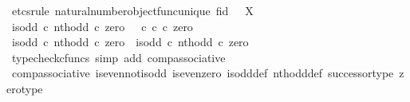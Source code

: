 \begin{isabellebody}
%
\isadelimproof
%
\endisadelimproof
%
\isatagproof
{}\isamarkupfalse%
\ {\isacharparenleft}{\kern0pt}etcs{\isacharunderscore}{\kern0pt}rule\ natural{\isacharunderscore}{\kern0pt}number{\isacharunderscore}{\kern0pt}object{\isacharunderscore}{\kern0pt}func{\isacharunderscore}{\kern0pt}unique{\isacharbrackleft}{\kern0pt}\ f{\isacharequal}{\kern0pt}{\isachardoublequoteopen}id\ {\isasymOmega}{\isachardoublequoteclose}{\isacharcomma}{\kern0pt}\ \ X{\isacharequal}{\kern0pt}{\isasymOmega}{\isacharbrackright}{\kern0pt}{\isacharparenright}{\kern0pt}\isanewline
\ \ \isamarkupfalse%
\ {\isachardoublequoteopen}{\isacharparenleft}{\kern0pt}is{\isacharunderscore}{\kern0pt}odd\ {\isasymcirc}\isactrlsub c\ nth{\isacharunderscore}{\kern0pt}odd{\isacharparenright}{\kern0pt}\ {\isasymcirc}\isactrlsub c\ zero\ {\isacharequal}{\kern0pt}\ {\isacharparenleft}{\kern0pt}{\isasymt}\ {\isasymcirc}\isactrlsub c\ {\isasymbeta}\isactrlbsub {\isasymnat}\isactrlsub c\isactrlesub {\isacharparenright}{\kern0pt}\ {\isasymcirc}\isactrlsub c\ zero{\isachardoublequoteclose}\isanewline
\ \ \isamarkupfalse%
\ {\isacharminus}{\kern0pt}\isanewline
\ \ \ \ \isamarkupfalse%
\ {\isachardoublequoteopen}{\isacharparenleft}{\kern0pt}is{\isacharunderscore}{\kern0pt}odd\ {\isasymcirc}\isactrlsub c\ nth{\isacharunderscore}{\kern0pt}odd{\isacharparenright}{\kern0pt}\ {\isasymcirc}\isactrlsub c\ zero\ {\isacharequal}{\kern0pt}\ is{\isacharunderscore}{\kern0pt}odd\ {\isasymcirc}\isactrlsub c\ nth{\isacharunderscore}{\kern0pt}odd\ {\isasymcirc}\isactrlsub c\ zero{\isachardoublequoteclose}\isanewline
\ \ \ \ \ \ \isamarkupfalse%
\ {\isacharparenleft}{\kern0pt}typecheck{\isacharunderscore}{\kern0pt}cfuncs{\isacharcomma}{\kern0pt}\ simp\ add{\isacharcolon}{\kern0pt}\ comp{\isacharunderscore}{\kern0pt}associative{}{\isacharparenright}{\kern0pt}\isanewline
\ \ \ \ \isamarkupfalse%
\ \isamarkupfalse%
\ {\isachardoublequoteopen}{\isachardot}{\kern0pt}{\isachardot}{\kern0pt}{\isachardot}{\kern0pt}\ {\isacharequal}{\kern0pt}\ {\isasymt}{\isachardoublequoteclose}\isanewline
\ \ \ \ \ \ \isamarkupfalse%
\ comp{\isacharunderscore}{\kern0pt}associative{}\ is{\isacharunderscore}{\kern0pt}even{\isacharunderscore}{\kern0pt}not{\isacharunderscore}{\kern0pt}is{\isacharunderscore}{\kern0pt}odd\ is{\isacharunderscore}{\kern0pt}even{\isacharunderscore}{\kern0pt}zero\ is{\isacharunderscore}{\kern0pt}odd{\isacharunderscore}{\kern0pt}def{}\ nth{\isacharunderscore}{\kern0pt}odd{\isacharunderscore}{\kern0pt}def{}\ successor{\isacharunderscore}{\kern0pt}type\ zero{\isacharunderscore}{\kern0pt}type\ \isamarkupfalse%

\end{isabellebody}
